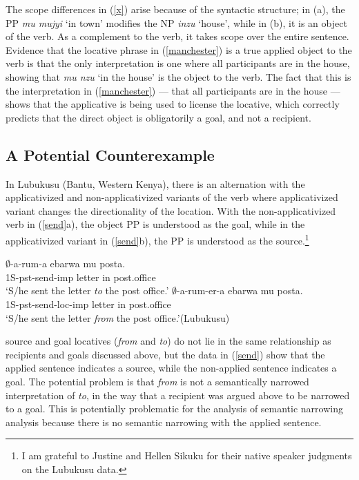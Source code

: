 \documentclass[output=paper]{langsci/langscibook}
\begin{document}
 The scope differences in (\ref{x}) arise because of the syntactic structure; in (a), the PP \emph{mu mujyi} `in town' modifies the NP \emph{inzu} `house', while in (b), it is an object of the verb. As a complement to the verb, it takes scope over the entire sentence. Evidence that the locative phrase in (\ref{manchester}) is a true applied object to the verb is that the only interpretation is one where all participants are in the house, showing that \emph{mu nzu} `in the house' is the object to the verb. The fact that this is the interpretation in (\ref{manchester}) ---  that all participants are in the house  --- shows that the applicative is being used to license the locative, which correctly predicts that the direct object is obligatorily a goal, and not a recipient. 
\fi

\iffalse
  

\subsection{A Potential Counterexample}

 

 In Lubukusu (Bantu, Western Kenya), there is an alternation with the applicativized and  non-applicativized variants of the verb where applicativized variant changes the directionality of the location. With the non-applicativized verb in (\ref{send}a), the object PP is understood as the goal, while in the applicativized variant in (\ref{send}b), the PP is understood as the source.\footnote{I am grateful to Justine and Hellen Sikuku for their native speaker judgments on the Lubukusu data.}

\begin{exe}
\ex\label{send} 
\begin{xlist}
\ex\gll $\emptyset$-a-rum-a ebarwa mu posta.\\
			{\sc 1S-pst-}send-{\sc imp} letter in post.office\\
			\glt `S/he sent the letter \emph{to} the post office.'
\ex\gll $\emptyset$-a-rum-er-a ebarwa mu posta.\\
			{\sc 1S-pst-}send-{\sc loc-imp} letter in post.office\\
			\glt `S/he sent the letter \emph{from} the post office.'\hfill (Lubukusu)
			\end{xlist}
\end{exe}
%
 {\sc source} and {\sc goal}  locatives (\emph{from} and \emph{to}) do not lie in the same relationship as recipients and goals discussed above, but the data in (\ref{send}) show that the applied sentence indicates a source, while the non-applied sentence indicates a goal. The potential problem is that \emph{from} is not a semantically narrowed interpretation of \emph{to}, in the way that a recipient was argued above to be narrowed to a goal. This is potentially problematic for the analysis of semantic narrowing analysis because there is no semantic narrowing with the applied sentence. 
 
\end{document}
